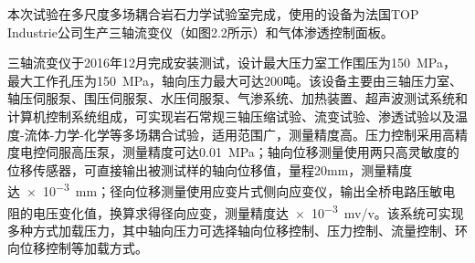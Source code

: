 本次试验在多尺度多场耦合岩石力学试验室完成，使用的设备为法国TOP Industrie公司生产三轴流变仪（如图2.2所示）和气体渗透控制面板。

三轴流变仪于2016年12月完成安装测试，设计最大压力室工作围压为\SI{150}{MPa}，最大工作孔压为\SI{150}{MPa}，轴向压力最大可达200吨。该设备主要由三轴压力室、轴压伺服泵、围压伺服泵、水压伺服泵、气渗系统、加热装置、超声波测试系统和计算机控制系统组成，可实现岩石常规三轴压缩试验、流变试验、渗透试验以及温度-流体-力学-化学等多场耦合试验，适用范围广，测量精度高。压力控制采用高精度电控伺服高压泵，测量精度可达\SI{0.01}{MPa}；轴向位移测量使用两只高灵敏度的位移传感器，可直接输出被测试样的轴向位移值，量程20mm，测量精度达\SI{e-3}{mm}；径向位移测量使用应变片式侧向应变仪，输出全桥电路压敏电阻的电压变化值，换算求得径向应变，测量精度达\SI{e-3}{mv/v}。该系统可实现多种方式加载压力，其中轴向压力可选择轴向位移控制、压力控制、流量控制、环向位移控制等加载方式。

